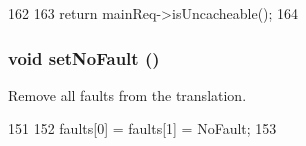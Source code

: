 \begin{DoxyCode}
162     {
163         return mainReq->isUncacheable();
164     }
\end{DoxyCode}
\hypertarget{classWholeTranslationState_a29ac402ee48ba100554ef01f2c8790c9}{
\subsubsection[{setNoFault}]{\setlength{\rightskip}{0pt plus 5cm}void setNoFault ()}}
\label{classWholeTranslationState_a29ac402ee48ba100554ef01f2c8790c9}
Remove all faults from the translation. 


\begin{DoxyCode}
151     {
152         faults[0] = faults[1] = NoFault;
153     }
\end{DoxyCode}


